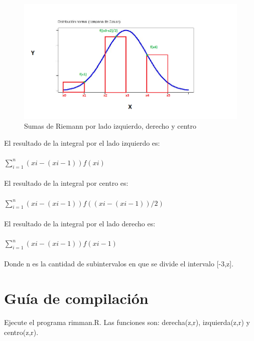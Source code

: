 \documentclass{article}
\begin{document}
\begin{figure}[h!]
\centering
\includegraphics[scale=0.5]{sumas.png}
\caption{Sumas de Riemann por lado izquierdo, derecho y centro}
\label{fig:fisica}
\end{figure}
\newpage
El resultado de la integral por el lado izquierdo es:\\\\
$\sum_{i=1}^{n}{(xi-(xi-1))f(xi)}$\\\\
El resultado de la integral por centro es:\\\\
$\sum_{i=1}^{n}{(xi-(xi-1))f((xi-(xi-1))/2)}$\\\\
El resultado de la integral por el lado derecho es:\\\\
$\sum_{i=1}^{n}{(xi-(xi-1))f(xi-1)}$\\\\
Donde n es la cantidad de subintervalos en que se divide el intervalo [-3,z].

\section{Guía de compilación}
Ejecute el programa rimman.R. Las funciones son: derecha(z,r), izquierda(z,r) y centro(z,r).
\end{document}

